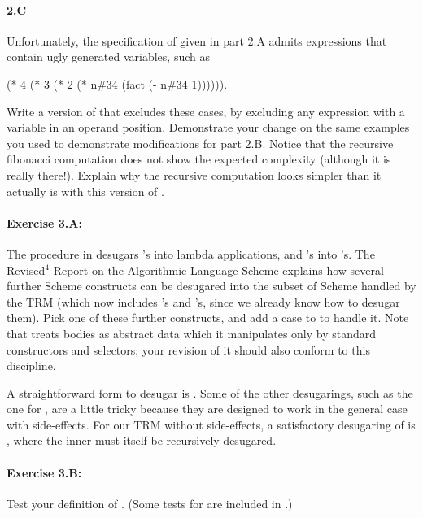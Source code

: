 \paragraph{2.C} Unfortunately, the specification of 
given in part 2.A admits expressions that contain ugly generated
variables, such as

\beginlispbig
(* 4 (* 3 (* 2 (* n\#34 (fact (- n\#34 1)))))).
\endlisp

Write a version of  that excludes these cases, by
excluding any expression with a variable in an operand position.
Demonstrate your change on the same examples you used to demonstrate
modifications for part 2.B.  Notice that the recursive fibonacci
computation does not show the expected complexity (although it is
really there!).  Explain why the recursive computation looks simpler
than it actually is with this version of .

\paragraph{Exercise 3.A:} The  procedure in
 desugars 's into lambda applications,
and 's into 's.  The Revised$^4$ Report on the
Algorithmic Language Scheme explains how
several further Scheme constructs can be desugared into the subset of
Scheme handled by the TRM (which now includes 's and
's, since we already know how to desugar them).  Pick one
of these further constructs, and add a case to  to
handle it.  Note that  treats bodies as abstract data
which it manipulates only by standard constructors and selectors; your
revision of it should also conform to this discipline.

A straightforward form to desugar is .  Some of the other
desugarings, such as the one for , are a little tricky
because they are designed to work in the general case with
side-effects.  For our TRM without side-effects, a satisfactory
desugaring of  is , where the inner  must itself be
recursively desugared.

\paragraph{Exercise 3.B:} Test your definition of .
(Some tests for  are included in .)


